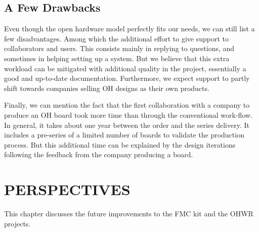 \documentclass{JAC2003}
\begin{document}


\subsection{A Few Drawbacks}
Even though the open hardware model perfectly fits our needs, we can still list a few disadvantages.
Among which the additional effort to give support to collaborators and users.
This consists mainly in replying to questions, and sometimes in helping setting up a system.
But we believe that this extra workload can be mitigated with additional quality in the project, essentially a good and up-to-date documentation.
Furthermore, we expect support to partly shift towards companies selling OH designs as their own products.

Finally, we can mention the fact that the first collaboration with a company to produce an OH board took more time than through the conventional work-flow.
In general, it takes about one year between the order and the series delivery.
It includes a pre-series of a limited number of boards to validate the production process.
But this additional time can be explained by the design iterations following the feedback from the company producing a board.


\section{PERSPECTIVES}
This chapter discusses the future improvements to the FMC kit and the OHWR projects.
\end{document}
